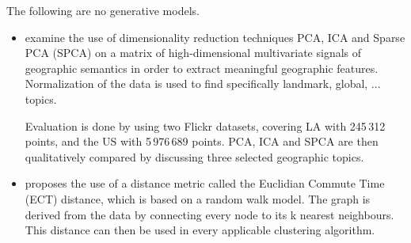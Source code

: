 %
The following are no generative models.

\begin{itemize}
\item \textcite{Sengstock2012a} examine the use of dimensionality reduction techniques PCA, ICA and Sparse PCA (SPCA) on a matrix of high-dimensional multivariate signals of geographic semantics in order to extract meaningful geographic features. %
Normalization of the data is used to find specifically landmark, global, ... topics.





Evaluation is done by using two Flickr datasets, covering LA with 245\,312 points, and the US with 5\,976\,689 points. PCA, ICA and SPCA are then qualitatively compared by discussing three selected geographic topics.


\item \textcite{Yen2005} proposes the use of a distance metric called the Euclidian Commute Time (ECT) distance, which is based on a random walk model. The graph is derived from the data by connecting every node to its k nearest neighbours. This distance can then be used in every applicable clustering algorithm.


\end{itemize}

